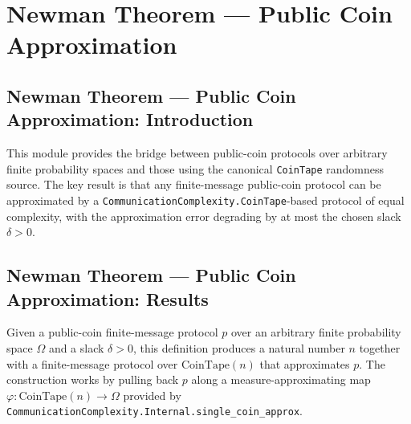 \section{Newman Theorem --- Public Coin Approximation}
\subsection*{Newman Theorem --- Public Coin Approximation: Introduction}

This module provides the bridge between public-coin protocols over arbitrary finite
probability spaces and those using the canonical \texttt{CoinTape} randomness source.
The key result is that any finite-message public-coin protocol can be approximated by a
\texttt{CommunicationComplexity.CoinTape}-based protocol of equal complexity, with the approximation error
degrading by at most the chosen slack $\delta > 0$.

\subsection*{Newman Theorem --- Public Coin Approximation: Results}

\begin{definition}
\label{CommunicationComplexity.PublicCoin.FiniteMessage.Protocol.toCoinTape}
\leanok
{}
Given a public-coin finite-message protocol $p$ over an arbitrary finite probability
space $\Omega$ and a slack $\delta > 0$, this definition produces a natural number $n$
together with a finite-message protocol over $\mathrm{CoinTape}(n)$ that approximates
$p$. The construction works by pulling back $p$ along a measure-approximating map
$\varphi : \mathrm{CoinTape}(n) \to \Omega$ provided by
\texttt{CommunicationComplexity.Internal.single\_coin\_approx}.
\end{definition}

